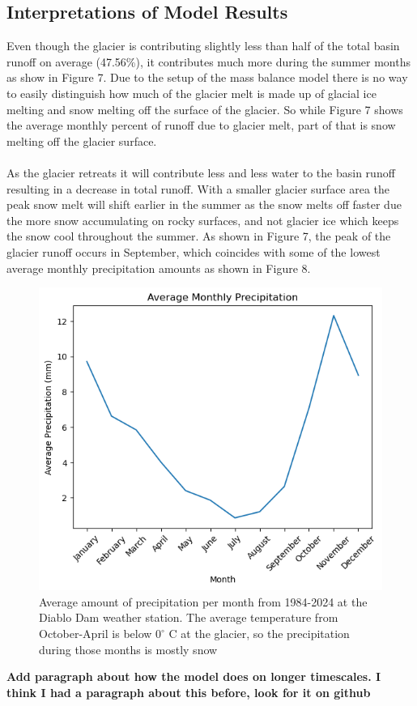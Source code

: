 \documentclass{article}
\begin{document}
\subsection{Interpretations of Model Results}
Even though the glacier is contributing slightly less than half of the total basin runoff on average (47.56\%), it contributes much more during the summer 
months as show in Figure 7. Due to the setup of the mass balance model there is no way to easily distinguish how much of the glacier melt is made 
up of glacial ice melting and snow melting off the surface of the glacier. So while Figure 7 shows the average monthly percent of runoff due to glacier 
melt, part of that is snow melting off the glacier surface. 
\paragraph{}
As the glacier retreats it will contribute less and less water to the basin runoff resulting in a decrease in total runoff. With a smaller glacier 
surface area the peak snow melt will shift earlier in the summer as the snow melts off faster due the more snow accumulating on rocky surfaces, and not glacier 
ice which keeps the snow cool throughout the summer. As shown in Figure 7, the peak of the glacier runoff occurs in September, which coincides 
with some of the lowest average monthly precipitation amounts as shown in Figure 8.

\begin{figure}[h!]
    \centering
    \includegraphics[width=\textwidth]{Plots/monthly_precip.png}
    \caption{Average amount of precipitation per month from 1984-2024 at the Diablo Dam weather station. The average temperature from October-April is below $0^\circ$ C at the glacier, so the precipitation during those months is mostly snow}
    \label{fig:monthly_precip}
\end{figure}    
\FloatBarrier
\textbf{Add paragraph about how the model does on longer timescales. I think I had a paragraph about this before, look for it on github}
\end{document}
